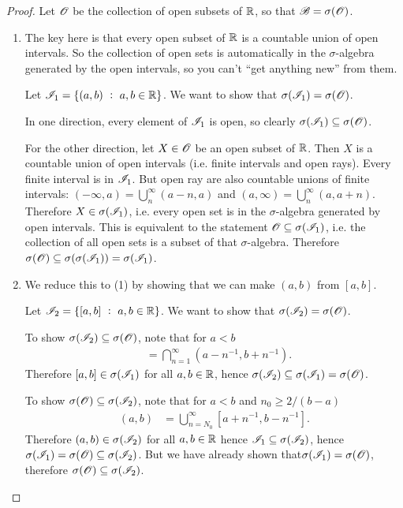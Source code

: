 \begin{proof}
  Let $\mathscr O$ be the collection of open subsets of $\mathbb{R}$, so that $\mathscr B = \sigma(\mathscr O)$.
  \begin{enumerate}
  \item The key here is that every open subset of $\mathbb{R}$ is a countable union of open intervals. So the collection of
    open sets is automatically in the $\sigma$-algebra generated by the open intervals, so you can't ``get
    anything new​'' from them.

    Let $\mathscr I_1 = \{(a, b) ~:~ a, b \in \mathbb{R}\}$. We want to show that $\sigma(\mathscr I_1) = \sigma(\mathscr O)$.

    In one direction, every element of $\mathscr I_1$ is open, so clearly $\sigma(\mathscr I_1) \subseteq \sigma(\mathscr O)$.

    For the other direction, let $X \in \mathscr O$ be an open subset of $\mathbb{R}$. Then $X$ is a countable union of open
    intervals (i.e. finite intervals and open rays). Every finite interval is in $\mathscr I_1$. But open ray are
    also countable unions of finite intervals: $(-\infty, a) = \bigcup_n^\infty (a-n, a)$
    and $(a, \infty) = \bigcup_n^\infty (a, a + n)$. Therefore $X \in \sigma(\mathscr I_1)$, i.e. every open set is
    in the $\sigma$-algebra generated by open intervals. This is equivalent to the
    statement $\mathscr O \subseteq \sigma(\mathscr I_1)$, i.e. the collection of all open sets is a subset of
    that $\sigma$-algebra. Therefore $\sigma(\mathscr O) \subseteq \sigma(\sigma(\mathscr I_1)) = \sigma(\mathscr I_1)$.

  \item We reduce this to (1) by showing that we can make $(a, b)$ from $[a, b]$.

    Let $\mathscr I_2 = \{[a, b] ~:~ a, b \in \mathbb{R}\}$. We want to show that $\sigma(\mathscr I_2) = \sigma(\mathscr O)$.

    To show $\sigma(\mathscr I_2) \subseteq \sigma(\mathscr O)$, note that for $a < b$
    \begin{align*}
      [a, b] &= \bigcap_{n=1}^\infty (a - n^{-1}, b + n^{-1}).
    \end{align*}
    Therefore $[a, b] \in \sigma(\mathscr I_1)$ for all $a, b \in \mathbb{R}$, hence $\sigma(\mathscr I_2) \subseteq \sigma(\mathscr I_1) = \sigma(\mathscr O)$.

    To show $\sigma(\mathscr O) \subseteq \sigma(\mathscr I_2)$, note that for $a < b$ and $n_0 \geq 2/(b - a)$
    \begin{align*}
      (a, b) &= \bigcup_{n=N_0}^\infty [a + n^{-1}, b - n^{-1}].
    \end{align*}
    Therefore $(a, b) \in \sigma(\mathscr I_2)$ for all $a, b \in \mathbb{R}$ hence $\mathscr I_1 \subseteq \sigma(\mathscr I_2)$,
    hence $\sigma(\mathscr I_1) = \sigma(\mathscr O) \subseteq \sigma(\mathscr I_2)$. But we have already shown
    that$\sigma(\mathscr I_1) = \sigma(\mathscr O)$, therefore $\sigma(\mathscr O) \subseteq \sigma(\mathscr I_2)$.
  \end{enumerate}
\end{proof}

